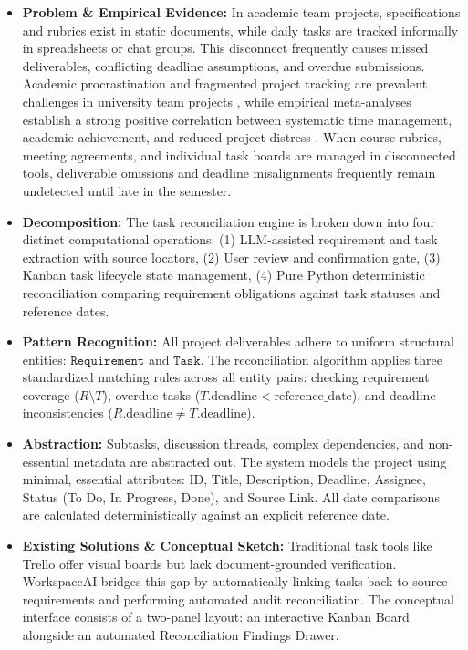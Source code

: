 \begin{itemize}[leftmargin=*,itemsep=3pt]

    \item \textbf{Problem \& Empirical Evidence:} In academic team projects, specifications and rubrics exist in static documents, while daily tasks are tracked informally in spreadsheets or chat groups. This disconnect frequently causes missed deliverables, conflicting deadline assumptions, and overdue submissions. Academic procrastination and fragmented project tracking are prevalent challenges in university team projects \cite{shatz2026procrastination}, while empirical meta-analyses establish a strong positive correlation between systematic time management, academic achievement, and reduced project distress \cite{aeon2021timemanagement}. When course rubrics, meeting agreements, and individual task boards are managed in disconnected tools, deliverable omissions and deadline misalignments frequently remain undetected until late in the semester.

    \item \textbf{Decomposition:} The task reconciliation engine is broken down into four distinct computational operations: (1) LLM-assisted requirement and task extraction with source locators, (2) User review and confirmation gate, (3) Kanban task lifecycle state management, (4) Pure Python deterministic reconciliation comparing requirement obligations against task statuses and reference dates.

    \item \textbf{Pattern Recognition:} All project deliverables adhere to uniform structural entities: $\texttt{Requirement}$ and $\texttt{Task}$. The reconciliation algorithm applies three standardized matching rules across all entity pairs: checking requirement coverage ($R \setminus T$), overdue tasks ($T.\text{deadline} < \text{reference\_date}$), and deadline inconsistencies ($R.\text{deadline} \neq T.\text{deadline}$).

    \item \textbf{Abstraction:} Subtasks, discussion threads, complex dependencies, and non-essential metadata are abstracted out. The system models the project using minimal, essential attributes: ID, Title, Description, Deadline, Assignee, Status (To Do, In Progress, Done), and Source Link. All date comparisons are calculated deterministically against an explicit reference date.

    \item \textbf{Existing Solutions \& Conceptual Sketch:} Traditional task tools like Trello \cite{trelloAIBoards} offer visual boards but lack document-grounded verification. WorkspaceAI bridges this gap by automatically linking tasks back to source requirements and performing automated audit reconciliation. The conceptual interface consists of a two-panel layout: an interactive Kanban Board alongside an automated Reconciliation Findings Drawer.

\end{itemize}



